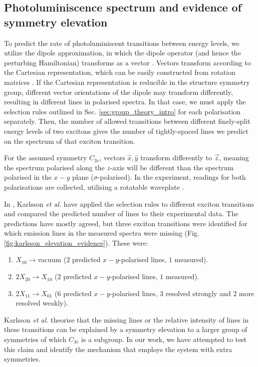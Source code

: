 \subsection[Photoluminiscence spectrum]{Photoluminiscence spectrum and evidence of symmetry elevation}

To predict the rate of photoluminiscent transitions between energy levels, we utilize the dipole approximation, in which the dipole operator (and hence the perturbing Hamiltonian) transforms as a vector \cite[p. 13]{karlsson}. Vectors transform according to the Cartesian representation, which can be easily constructed from rotation matrices \cite[p. 160]{wigner}. If the Cartesian representation is reducible in the structure symmetry group, different vector orientations of the dipole may transform differently, resulting in different lines in polarised spectra. In that case, we must apply the selection rules outlined in Sec. \ref{sec:group_theory_intro} for each polarisation separately. Then, the number of allowed transitions between different finely-split energy levels of two excitons gives the number of tightly-spaced lines we predict on the spectrum of that exciton transition.

For the assumed symmetry $C_{3v}$, vectors $\hat{x},\hat{y}$ transform differently to $\vec{z}$, meaning the spectrum polarised along the $z$-axis will be different than the spectrum polarised in the $x-y$ plane ($\sigma$-polarised). In the experiment, readings for both polarisations are collected, utilising a rotatable waveplate \cite[p. 2]{karlsson}.

In \cite{karlsson}, Karlsson \textit{et al.} have applied the selection rules to different exciton transitions and compared the predicted number of lines to their experimental data. The predictions have mostly agreed, but three exciton transitions were identified for which emission lines in the measured spectra were missing (Fig. \ref{fig:karlsson_elevation_evidence}). These were:
\begin{enumerate}
\item $X_{10}\to $vacuum ($2$ predicted $x-y$-polarised lines, $1$ measured).
\item $2X_{20}\to X_{10}$ ($2$ predicted $x-y$-polarised lines, $1$ measured).
\item $2X_{11}\to X_{01}$ ($6$ predicted $x-y$-polarised lines, $3$ resolved strongly and $2$ more resolved weakly).
\end{enumerate}
Karlsson \textit{et al.} theorise that the missing lines or the relative intensity of lines in these transitions can be explained by a symmetry elevation to a larger group of symmetries of which $C_{3v}$ is a subgroup. In our work, we have attempted to test this claim and identify the mechanism that employs the system with extra symmetries.


